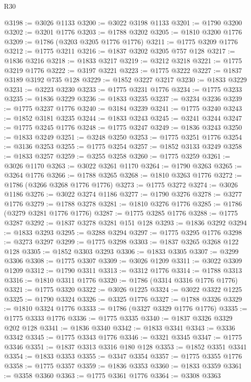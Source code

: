 \begin{lexlean}{R30}
\begin{coremodule}
{{{{{@3198 := @3026 @1133
@3200 := @3022 @3198 @1133
@3201 := @1790 @3200
@3202 := @3201 @1776
@3203 := @1788 @3202
@3205 := @1810 @3200 @1776
@3209 := @1786 (@3203 @3205 @1776 @1776)
@3211 := @1775 @3209 @1776
@3212 := @1775 @3211
@3216 := @1837 @3202 @3205 @757 @128
@3217 := @1836 @3216
@3218 := @1833 @3217
@3219 := @3212 @3218
@3221 := @1775 @3219 @1776
@3222 := @3197 @3221
@3223 := @1775 @3222
@3227 := @1837 @3189 @3192 @735 @128
@3229 := @1852 @3227 @3217
@3230 := @1833 @3229
@3231 := @3223 @3230
@3233 := @1775 @3231 @1776
@3234 := @1775 @3233
@3235 := @1836 @3229
@3236 := @1833 @3235
@3237 := @3234 @3236
@3239 := @1775 @3237 @1776
@3240 := @3184 @3239
@3241 := @1775 @3240
@3243 := @1852 @3181 @3235
@3244 := @1833 @3243
@3245 := @3241 @3244
@3247 := @1775 @3245 @1776
@3248 := @1775 @3247
@3249 := @1836 @3243
@3250 := @1833 @3249
@3251 := @3248 @3250
@3253 := @1775 @3251 @1776
@3254 := @3136 @3253
@3255 := @1775 @3254
@3257 := @1852 @3133 @3249
@3258 := @1833 @3257
@3259 := @3255 @3258
@3260 := @1775 @3259
@3261 := @3026 @1170
@3263 := @3022 @3261 @1170
@3264 := @1790 @3263
@3265 := @3264 @1776
@3266 := @1788 @3265
@3268 := @1810 @3263 @1776
@3272 := @1786 (@3266 @3268 @1776 @1776)
@3273 := @1775 @3272
@3274 := @3026 @1186
@3276 := @3022 @3274 @1186
@3277 := @1790 @3276
@3278 := @3277 @1776
@3279 := @1788 @3278
@3281 := @1810 @3276 @1776
@3285 := @1786 (@3279 @3281 @1776 @1776)
@3287 := @1775 @3285 @1776
@3288 := @1775 @3287
@3292 := @1837 @3278 @3281 @151 @128
@3293 := @1836 @3292
@3294 := @1833 @3293
@3295 := @3288 @3294
@3297 := @1775 @3295 @1776
@3298 := @3273 @3297
@3299 := @1775 @3298
@3303 := @1837 @3265 @3268 @122 @128
@3305 := @1852 @3303 @3293
@3306 := @1833 @3305
@3307 := @3299 @3306
@3308 := @1775 @3307
@3309 := @3026 @1209
@3311 := @3022 @3309 @1209
@3312 := @1790 @3311
@3313 := @3312 @1776
@3314 := @1788 @3313
@3316 := @1810 @3311 @1776
@3320 := @1786 (@3314 @3316 @1776 @1776)
@3321 := @1775 @3320
@3322 := @3026 @1225
@3324 := @3022 @3322 @1225
@3325 := @1790 @3324
@3326 := @3325 @1776
@3327 := @1788 @3326
@3329 := @1810 @3324 @1776
@3333 := @1786 (@3327 @3329 @1776 @1776)
@3335 := @1775 @3333 @1776
@3336 := @1775 @3335
@3340 := @1837 @3326 @3329 @202 @128
@3341 := @1836 @3340
@3342 := @1833 @3341
@3343 := @3336 @3342
@3345 := @1775 @3343 @1776
@3346 := @3321 @3345
@3347 := @1775 @3346
@3351 := @1837 @3313 @3316 @180 @128
@3353 := @1852 @3351 @3341
@3354 := @1833 @3353
@3355 := @3347 @3354
@3357 := @1775 @3355 @1776
@3358 := @1775 @3357
@3359 := @1836 @3353
@3360 := @1833 @3359
@3361 := @3358 @3360
@3363 := @1775 @3361 @1776
@3364 := @3308 @3363
}}}}}
\end{coremodule}
\end{lexlean}
